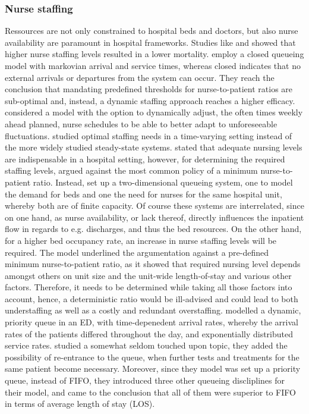 \documentclass[11pt,a4paper]{article}
\begin{document}
\begin{spacing}{1.8}
\subsubsection{Nurse staffing}
Ressources are not only constrained to hospital beds and doctors, but also nurse availability are paramount in hospital frameworks. Studies like \citep{Needleman2002} and \citep{Aiken2002} showed that higher nurse staffing levels resulted in a lower mortality.
\citep{Vericourt2011} employ a closed queueing model with markovian arrival and service times, whereas closed indicates that no external arrivals or departures from the system can occur. They reach the conclusion that mandating predefined thresholds for nurse-to-patient ratios are sub-optimal and, instead, a dynamic staffing approach reaches a higher efficacy. 
\citep{Bard2005} considered a model with the option to dynamically adjust, the often times weekly ahead planned, nurse schedules to be able to better adapt to unforeseeable fluctuations.
\citet{Green2007} studied optimal staffing needs in a time-varying setting instead of the more widely studied steady-state systems. \citet{Yankovic2011} stated that adequate nursing levels are indispensable in a hospital setting, however, for determining the required staffing levels, \citet{Yankovic2011} argued against the most common policy of a minimum nurse-to-patient ratio. Instead,  \citet{Yankovic2011} set up a two-dimensional queueing system, one to model the demand for beds and one the need for nurses for the same hospital unit, whereby both are of finite capacity. Of course these systems are interrelated, since on one hand,  as nurse availability, or lack thereof, directly influences the inpatient flow in regards to e.g. discharges, and thus the bed resources. On the other hand, for a higher  bed occupancy rate,  an increase in nurse staffing levels will be required. 
The model underlined the argumentation against a pre-defined minimum nurse-to-patient ratio, as it showed that required nursing level depends amongst others on unit size and the unit-wide length-of-stay and various other factors. Therefore, it needs to be determined while taking all those factors into account, hence, a deterministic ratio would be ill-advised and could lead to both understaffing as well as a costly and redundant overstaffing. 
\citet{Tan2012} modelled a dynamic, priority queue in an ED, with time-depenedent arrival rates, whereby the arrival rates of the patients differed throughout the day, and exponentially distributed service rates. \citet{Tan2012} studied a somewhat seldom touched upon topic, they added the possibility of re-entrance to the queue, when further tests and treatments for the same patient become necessary.  Moreover, since they model was set up a priority queue, instead of  FIFO,
they introduced three other queueing discliplines for their model, and came to the conclusion that all of them were superior to FIFO in terms of average length of stay (LOS). 





\end{spacing}
\end{document}
